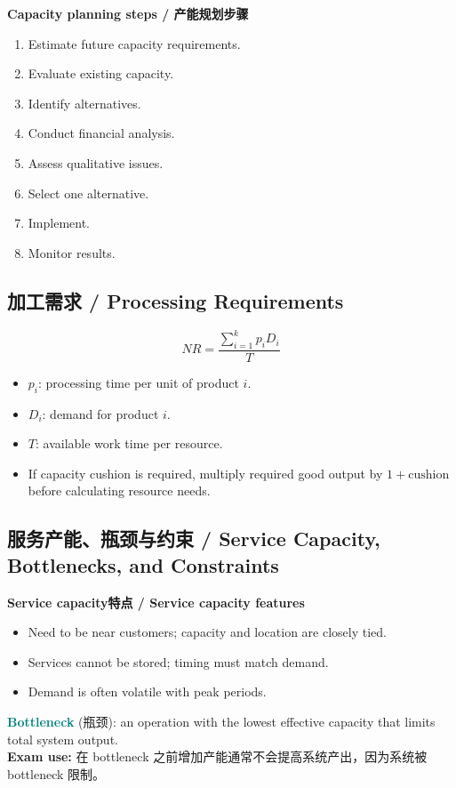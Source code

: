 \documentclass[10pt,a4paper]{ctexart}
\newcommand{\term}[2]{\textbf{\textcolor{Teal}{#1}} \textcolor{Muted}{(#2)}}
\newcommand{\exam}[1]{\textcolor{Amber}{\textbf{Exam use:} #1}}
\begin{document}
\textbf{Capacity planning steps / 产能规划步骤}
\begin{enumerate}
  \item Estimate future capacity requirements.
  \item Evaluate existing capacity.
  \item Identify alternatives.
  \item Conduct financial analysis.
  \item Assess qualitative issues.
  \item Select one alternative.
  \item Implement.
  \item Monitor results.
\end{enumerate}

\subsection{加工需求 / Processing Requirements}
\[
NR=\frac{\sum_{i=1}^{k}p_iD_i}{T}
\]
\begin{itemize}
  \item $p_i$: processing time per unit of product $i$.
  \item $D_i$: demand for product $i$.
  \item $T$: available work time per resource.
  \item If capacity cushion is required, multiply required good output by $1+\text{cushion}$ before calculating resource needs.
\end{itemize}

\subsection{服务产能、瓶颈与约束 / Service Capacity, Bottlenecks, and Constraints}
\label{subsec:bottleneck}

\textbf{Service capacity特点 / Service capacity features}
\begin{itemize}
  \item Need to be near customers; capacity and location are closely tied.
  \item Services cannot be stored; timing must match demand.
  \item Demand is often volatile with peak periods.
\end{itemize}

\term{Bottleneck}{瓶颈}: an operation with the lowest effective capacity that limits total system output.\\
\exam{在 bottleneck 之前增加产能通常不会提高系统产出，因为系统被 bottleneck 限制。}
\end{document}

